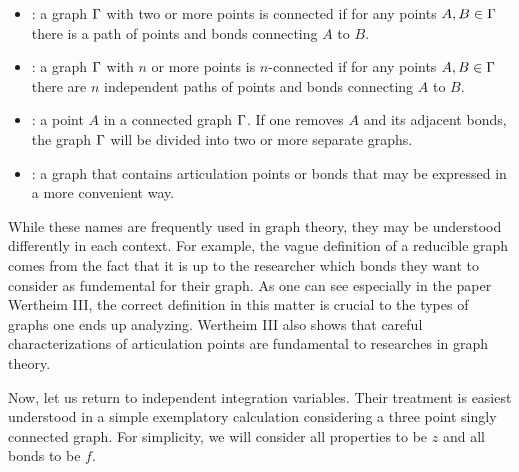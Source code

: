 \documentclass[8.5pt,twoside,twocolumn]{article}
\theoremstyle{standard}
\begin{document}
\begin{itemize}
  \item {}: a graph $\Gamma$ with two or more points is connected if for any points
  $A, B \in \Gamma$ there is a path of points and bonds connecting $A$ to $B$.
  \item {}: a graph $\Gamma$ with $n$
  or more points is $n$-connected if for any points $A, B \in \Gamma$ there are $n$
  independent paths of points and bonds connecting $A$ to $B$.
  \item {}: a point $A$ in a connected graph $\Gamma$. If one removes
  $A$ and its adjacent bonds, the graph $\Gamma$ will be divided into two or more separate graphs.
  \item {}: a graph that contains articulation points or bonds that may be
  expressed in a more convenient way.
\end{itemize}

While these names are frequently used in graph theory, they may be understood differently in each context.
For example, the vague definition of a reducible graph comes from the fact that it is up to the
researcher which bonds they want to consider as fundemental for their graph.
As one can see especially in the paper Wertheim III\cite{Wertheim3}, the
correct definition in this matter is crucial to the types of graphs one ends up
analyzing. Wertheim III also shows that careful characterizations of
articulation points are fundamental to researches in graph theory.

Now, let us return to independent integration variables. Their treatment is
easiest understood in a simple exemplatory calculation considering a three
point singly connected graph. For simplicity, we will consider all properties
to be $z$ and all bonds to be $f$.
\end{document}
